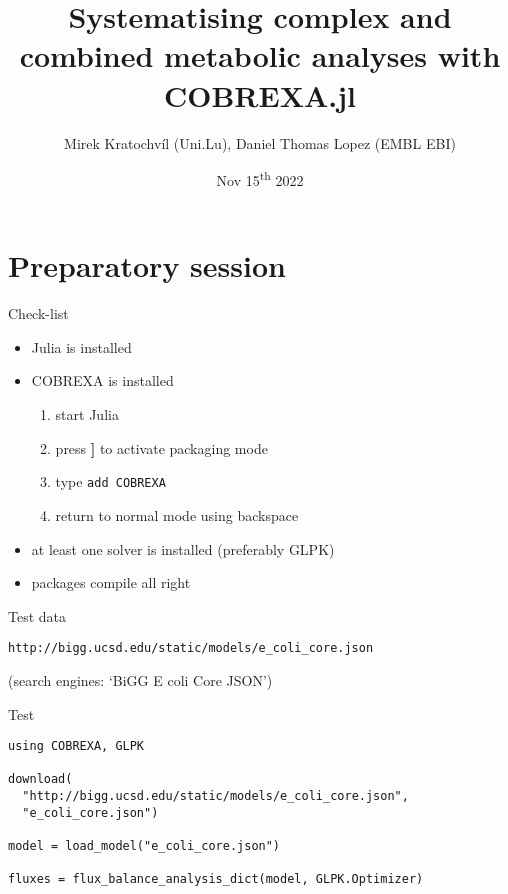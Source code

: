 \documentclass[aspectratio=169]{beamer}
\title{Systematising complex and combined metabolic analyses with COBREXA.jl}
\author{Mirek Kratochvíl (Uni.Lu), Daniel Thomas Lopez (EMBL EBI)}
\date{Nov 15\textsuperscript{th} 2022}
\begin{document}
\maketitle

\setcounter{section}{-1}
\section{Preparatory session}

\begin{frame}{Check-list}
\begin{itemize}
\item Julia is installed
\item COBREXA is installed
\begin{enumerate}
\item start Julia
\item press \textbf{\Large\ttfamily ]} to activate packaging mode
\item type \texttt{add COBREXA}
\item return to normal mode using backspace
\end{enumerate}
\item at least one solver is installed (preferably GLPK)
\item packages compile all right
\end{itemize}
\end{frame}

\begin{frame}[fragile]{Test data}
\begin{center}
\verb|http://bigg.ucsd.edu/static/models/e_coli_core.json|

(search engines: `BiGG E coli Core JSON')
\end{center}
\end{frame}

\begin{frame}[fragile]{Test}
\begin{verbatim}
using COBREXA, GLPK

download(
  "http://bigg.ucsd.edu/static/models/e_coli_core.json",
  "e_coli_core.json")

model = load_model("e_coli_core.json")

fluxes = flux_balance_analysis_dict(model, GLPK.Optimizer)
\end{verbatim}
\end{frame}

{
\renewcommand{\lastslidethanks}{See you on Nov 15\textsuperscript{th}!}
\makelastslide{}
}
\end{document}
